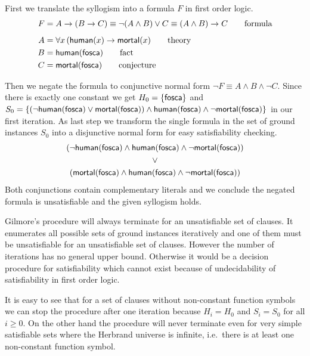 \begin{example}\label{ex:syllo}
	First we translate the syllogism into a formula $F$ in first order logic.
	\begin{align*}
		F &= A \rightarrow (B \rightarrow C) \equiv \lnot(A\land B) \lor C \equiv (A\land B)\rightarrow C  
		\tag*{formula}
		\\[0.5em]
		A &= \forall x\, ( \mathsf{human}(x) \rightarrow \mathsf{mortal}(x) 
		\tag*{theory}
		\\
		B &= \mathsf{human}(\mathsf{fosca}) 
		\tag*{fact}
		\\
		C &= \mathsf{mortal}(\mathsf{fosca})
		\tag*{conjecture}
	\end{align*}
 


	Then we negate the formula to conjunctive normal form $\lnot F \equiv A\land B \land\lnot C$.
	Since there is exactly one constant we get
	$H_0 = \{ \mathsf{fosca} \}$ and 
	$S_0 = 
	\{
	(\lnot\mathsf{human}(\mathsf{fosca})\lor\mathsf{mortal}(\mathsf{fosca}))\land\mathsf{human}(\mathsf{fosca})\land\lnot\mathsf{mortal}(\mathsf{fosca})
	\}$ in our first iteration. 
	As last step we transform the single formula in 
	the set of ground instances $S_0$ into a disjunctive normal form 
	for easy satisfiability checking.
%
\begin{gather*}
(\lnot\mathsf{human}(\mathsf{fosca})\land\mathsf{human}(\mathsf{fosca})\land\lnot\mathsf{mortal}(\mathsf{fosca}))
\\ 
\lor
\\ 
(\mathsf{mortal}(\mathsf{fosca})\land\mathsf{human}(\mathsf{fosca})\land\lnot\mathsf{mortal}(\mathsf{fosca}))
\end{gather*}
Both conjunctions contain complementary literals and we conclude the negated formula is unsatisfiable
 and the given syllogism holds.
 
\end{example}

Gilmore's procedure will always terminate for an unsatisfiable set of clauses.
It enumerates all possible sets of ground instances iteratively
and one of them must be unsatisfiable for an unsatisfiable set of clauses. 
However the number of iterations has no general upper bound. 
Otherwise it would be a decision procedure for satisfiability
which cannot exist because of undecidability of satisfiability in first order logic.

It is easy to see that for a set of clauses without non-constant function symbols
we can stop the procedure after one iteration because $H_i = H_0$ and $S_i = S_0$ for all $i\geq0$.
%
On the other hand the procedure will never terminate 
even for very simple satisfiable sets where the Herbrand universe is infinite, 
i.e.~there is at least one non-constant function symbol.


